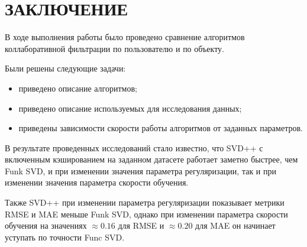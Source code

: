 \section*{ЗАКЛЮЧЕНИЕ}
В ходе выполнения работы было проведено сравнение алгоритмов коллаборативной фильтрации по пользователю и по объекту.

Были решены следующие задачи:
\begin{itemize}
	\item приведено описание алгоритмов;
	\item приведено описание используемых для исследования данных;
	\item приведены зависимости скорости работы алгоритмов от заданных параметров.
\end{itemize}

В результате проведенных исследований стало известно, что SVD++ с включенным кэшированием на заданном датасете работает заметно быстрее, чем Funk SVD, и при изменении значения параметра регуляризации, так и при изменении значения параметра скорости обучения.

Также SVD++ при изменении параметра регуляризации показывает метрики RMSE и MAE меньше Funk SVD, однако при изменении параметра скорости обучения на значениях $\approx 0.16$ для RMSE и $\approx 0.20$ для MAE он начинает уступать по точности Func SVD.

\pagebreak